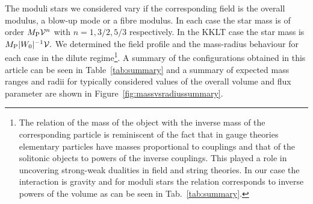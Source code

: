 \documentclass[11pt,a4paper]{article}
\begin{document}
The moduli stars we considered vary if the corresponding field is the overall modulus, a blow-up mode or a fibre modulus. In each case the star mass is of order $M_{\rm P} \mathcal{V}^{n}$ with $n=1, 3/2, 5/3$ respectively. In the KKLT case the star mass is $M_{\rm P} |W_0|^{-1}\mathcal{V}.$ We determined the field profile and the mass-radius behaviour for each case in the dilute regime\footnote{The relation of the mass of the object with the inverse mass of the corresponding particle is reminiscent of the fact that in gauge theories elementary particles have masses proportional to couplings and that of the solitonic objects to powers of the inverse couplings. This played a role in uncovering strong-weak dualities in field and string theories. In our case the interaction is gravity and for moduli stars the relation corresponds to inverse powers of the volume as can be seen in Tab.~\ref{tab:summary}.}. A summary of the configurations obtained in this article can be seen in Table~\ref{tab:summary} and a summary of expected mass ranges and radii for typically considered values of the overall volume and flux parameter are shown in Figure~\ref{fig:massvsradiussummary}.
\end{document}
